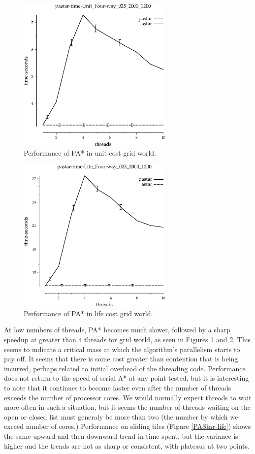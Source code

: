 \documentclass{article}
\begin{document}
\begin{figure}[h!]
\includegraphics[width=3in]{../graphs/seth/grid-unit-single/PAStar.eps}
\caption{Performance of PA* in unit cost grid world.}
\label{fig:PAStar-grid}
\end{figure}

\begin{figure}[h!]
\includegraphics[width=3in]{../graphs/seth/grid-life-single/PAStar.eps}
\caption{Performance of PA* in life cost grid world.}
\label{fig:PAStar-life}
\end{figure}

At low numbers of threads, PA* becomes much slower, followed by a sharp speedup at greater than 4 threads for grid world, as seen in Figures \ref{fig:PAStar-grid} and \ref{fig:PAStar-life}. This seems to indicate a critical mass at which the algorithm's parallelism starts to pay off. It seems that there is some cost greater than contention that is being incurred, perhaps related to initial overhead of the threading code. Performance does not return to the speed of serial A* at any point tested, but it is interesting to note that it continues to become faster even after the number of threads exceeds the number of processor cores. We would normally expect threads to wait more often in such a situation, but it seems the number of threads waiting on the open or closed list must generaly be more than two (the number by which we exceed number of cores.) Performance on sliding tiles (Figure \ref{PAStar-life}) shows the same upward and then downward trend in time spent, but the variance is higher and the trends are not as sharp or consistent, with plateaus at two points.
\end{document}
